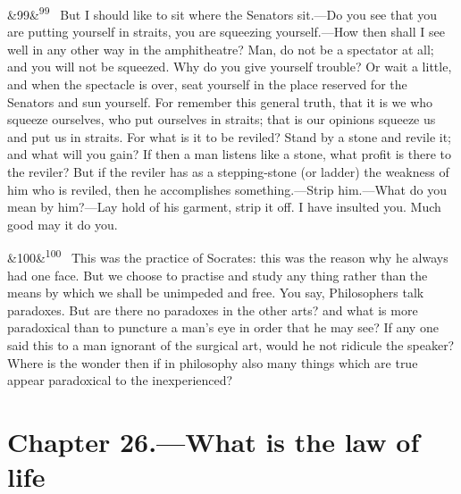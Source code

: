 \documentclass[12pt]{article}
\newcommand{\para}[1][]{\par\noindent\ifx&#1&\else\textsuperscript{\footnotesize #1}~\fi}
\begin{document}
\para[99] But I should like to sit where the Senators sit.—Do you see that you are putting yourself in straits, you are squeezing yourself.—How then shall I see well in any other way in the amphitheatre? Man, do not be a spectator at all; and you will not be squeezed. Why do you give yourself trouble? Or wait a little, and when the spectacle is over, seat yourself in the place reserved for the Senators and sun yourself. For remember this general truth, that it is we who squeeze ourselves, who put ourselves in straits; that is our opinions squeeze us and put us in straits. For what is it to be reviled? Stand by a stone and revile it; and what will you gain? If then a man listens like a stone, what profit is there to the reviler? But if the reviler has as a stepping-stone (or ladder) the weakness of him who is reviled, then he accomplishes something.—Strip him.—What do you mean by him?—Lay hold of his garment, strip it off. I have insulted you. Much good may it do you.

\para[100] This was the practice of Socrates: this was the reason why he always had one face. But we choose to practise and study any thing rather than the means by which we shall be unimpeded and free. You say, Philosophers talk paradoxes. But are there no paradoxes in the other arts? and what is more paradoxical than to puncture a man's eye in order that he may see? If any one said this to a man ignorant of the surgical art, would he not ridicule the speaker? Where is the wonder then if in philosophy also many things which are true appear paradoxical to the inexperienced?

\section*{Chapter 26.---What is the law of life}
\end{document}

